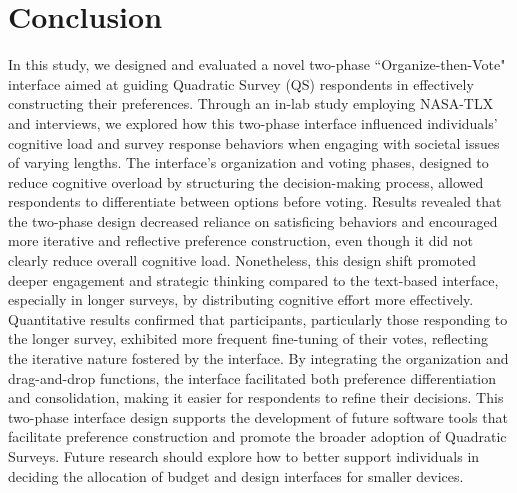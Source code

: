 \section{Conclusion}
In this study, we designed and evaluated a novel two-phase ``Organize-then-Vote" interface aimed at guiding Quadratic Survey (QS) respondents in effectively constructing their preferences. Through an in-lab study employing NASA-TLX and interviews, we explored how this two-phase interface influenced individuals' cognitive load and survey response behaviors when engaging with societal issues of varying lengths. The interface’s organization and voting phases, designed to reduce cognitive overload by structuring the decision-making process, allowed respondents to differentiate between options before voting. Results revealed that the two-phase design decreased reliance on satisficing behaviors and encouraged more iterative and reflective preference construction, even though it did not clearly reduce overall cognitive load. Nonetheless, this design shift promoted deeper engagement and strategic thinking compared to the text-based interface, especially in longer surveys, by distributing cognitive effort more effectively. Quantitative results confirmed that participants, particularly those responding to the longer survey, exhibited more frequent fine-tuning of their votes, reflecting the iterative nature fostered by the interface. By integrating the organization and drag-and-drop functions, the interface facilitated both preference differentiation and consolidation, making it easier for respondents to refine their decisions. This two-phase interface design supports the development of future software tools that facilitate preference construction and promote the broader adoption of Quadratic Surveys. Future research should explore how to better support individuals in deciding the allocation of budget and design interfaces for smaller devices.
